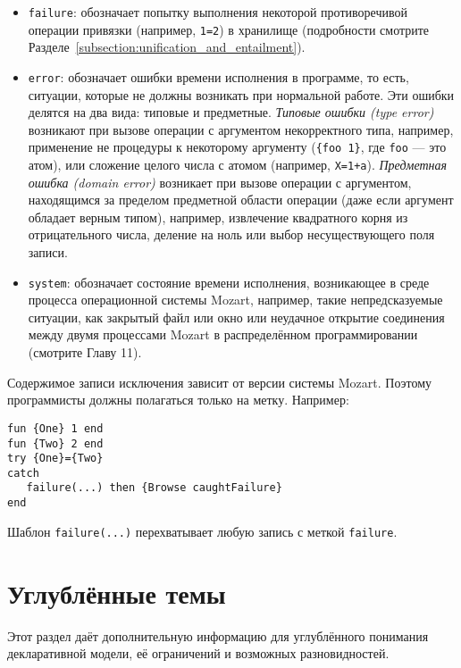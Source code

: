 \begin{itemize}
\item{\lstinline!failure!: обозначает попытку выполнения некоторой противоречивой операции привязки (например, \lstinline!1=2!) в хранилище (подробности смотрите Разделе~\ref{subsection:unification_and_entailment}).}

\item{\lstinline!error!: обозначает ошибки времени исполнения в программе, то есть, ситуации, которые не должны возникать при нормальной работе. Эти ошибки делятся на два вида: типовые и предметные. \emph{Типовые ошибки (type error)} возникают при вызове операции с аргументом некорректного типа, например, применение не процедуры к некоторому аргументу (\lstinline!{foo 1}!, где \lstinline!foo! --- это атом), или сложение целого числа с атомом (например, \lstinline!X=1+a!). \emph{Предметная ошибка (domain error)} возникает при вызове операции с аргументом, находящимся за пределом предметной области операции (даже если аргумент обладает верным типом), например, извлечение квадратного корня из отрицательного числа, деление на ноль или выбор несуществующего поля записи.}

\item{\lstinline!system!: обозначает состояние времени исполнения, возникающее в среде процесса операционной системы Mozart, например, такие непредсказуемые ситуации, как закрытый файл или окно или неудачное открытие соединения между двумя процессами Mozart в распределённом программировании (смотрите Главу 11).}
\end{itemize}

Содержимое записи исключения зависит от версии системы Mozart. Поэтому программисты должны полагаться только на метку. Например:

\begin{lstlisting}
fun {One} 1 end
fun {Two} 2 end
try {One}={Two}
catch
   failure(...) then {Browse caughtFailure}
end
\end{lstlisting}

Шаблон \lstinline!failure(...)! перехватывает любую запись с меткой \lstinline!failure!.

\section{Углублённые темы}\label{section:advanced_topics}

Этот раздел даёт дополнительную информацию для углублённого понимания декларативной модели, её ограничений и возможных разновидностей.

